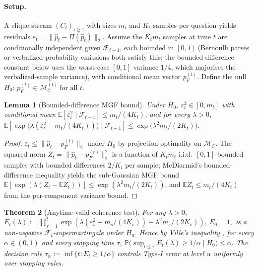 \documentclass{article}
\theoremstyle{plain}
\newtheorem{theorem}{Theorem}[section]
\newtheorem{lemma}[theorem]{Lemma}
\theoremstyle{definition}
\theoremstyle{remark}
\newcommand{\MC}{\mathcal{M}_C}
\newcommand{\hpK}{\hat p}
\newcommand{\pF}{p_F}
\newcommand{\E}{\mathbb{E}}
\newcommand{\PP}{\mathbb{P}}
\newcommand{\F}{\mathcal{F}}
\newcommand{\eps}{\varepsilon}
\begin{document}
\paragraph{Setup.}
A clique stream $(C_t)_{t\ge 1}$ with sizes $m_t$ and $K_t$ samples
per question yields residuals $\eps_t = \|\hpK_t - \Pi(\hpK_t)\|_2$.
Assume the $K_t m_t$ samples at time $t$ are conditionally
independent given $\F_{t-1}$, each bounded in $[0,1]$ (Bernoulli
parses or verbalized-probability emissions both satisfy this; the
bounded-difference constant below uses the worst-case $[0,1]$
variance $1/4$, which majorises the verbalized-sample variance),
with conditional mean vector $\pF^{(t)}$. Define the null
\(
H_0:\,\pF^{(t)} \in \MC^{(t)}\ \text{for all $t$}.
\)

\begin{lemma}[Bounded-difference MGF bound]
\label{lem:hoeff}
Under $H_0$, $\eps_t^2 \in [0, m_t]$ with conditional mean
$\E[\eps_t^2 \mid \F_{t-1}] \le m_t/(4K_t)$, and for every
$\lambda > 0$,
\(
\E\!\left[\exp\!\bigl(\lambda(\eps_t^2 - m_t/(4K_t))\bigr) \mid
\F_{t-1}\right]
\le \exp\!\bigl(\lambda^2 m_t / (2K_t)\bigr).
\)
\end{lemma}

\begin{proof}
$\eps_t \le \|\hpK_t - \pF^{(t)}\|_2$ under $H_0$ by projection
optimality on $\MC$. The squared norm
$Z_t = \|\hpK_t - \pF^{(t)}\|_2^2$ is a function of $K_t m_t$
i.i.d.\ $[0,1]$-bounded samples with bounded differences $2/K_t$ per
sample; McDiarmid's bounded-difference inequality
\citep{mcdiarmid1989method} yields the sub-Gaussian MGF bound
$\E[\exp(\lambda(Z_t-\E Z_t))]\le \exp(\lambda^2 m_t/(2K_t))$, and
$\E Z_t \le m_t/(4K_t)$ from the per-component variance bound.
\end{proof}

\begin{theorem}[Anytime-valid coherence test]
\label{thm:audit}
For any $\lambda > 0$,
\(
E_t(\lambda) := \prod_{s=1}^{t} \exp(\lambda(\eps_s^2 - m_s/(4K_s))
- \lambda^2 m_s/(2K_s)),\ E_0=1,
\)
is a non-negative $\F_t$-supermartingale under $H_0$. Hence by
Ville's inequality \citep{ville1939etude,howard2021time}, for every
$\alpha \in (0,1)$ and every stopping time $\tau$,
\(
\PP\bigl(\sup_{t\le\tau} E_t(\lambda) \ge 1/\alpha \mid H_0\bigr)
\le \alpha.
\)
The decision rule
$\tau_\alpha := \inf\{t : E_t \ge 1/\alpha\}$ controls Type-I error
at level $\alpha$ uniformly over stopping rules.
\end{theorem}
\end{document}
